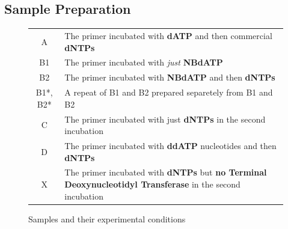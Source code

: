\documentclass[letterpaper]{article}
\newcommand{\tdt}{Terminal Deoxynucleotidyl Transferase}
\begin{document}
\subsection{Sample Preparation}
\begin{figure}[ht]
\begin{center}
\begin{tabular}{ c | l }
	\hline
	A & The primer incubated with \textbf{dATP} and then commercial \textbf{dNTPs} \\
	B1 & The primer incubated with \textit{just} \textbf{NBdATP} \\
	B2 & The primer incubated with \textbf{NBdATP} and then \textbf{dNTPs}\\
	B1*, B2* & A repeat of B1 and B2 prepared separetely from B1 and B2\\
	C & The primer incubated with just \textbf{dNTPs} in the second incubation \\
	D & The primer incubated with \textbf{ddATP} nucleotides and then \textbf{dNTPs} \\
	X & The primer incubated with \textbf{dNTPs} but \textbf{no \tdt{}} in the second incubation \\
	\hline
\end{tabular}
\end{center}
	\label{sampleTable}
	\caption{Samples and their experimental conditions}
\end{figure}
\end{document}
